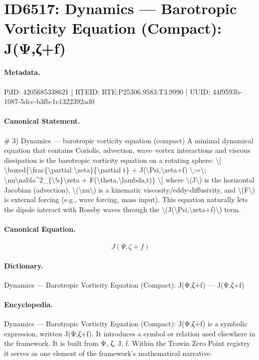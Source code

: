 \section*{ID6517: Dynamics — Barotropic Vorticity Equation (Compact): J(Ψ,ζ+f)}
\paragraph{Metadata.}
PiID: 4205685338621 | RTEID: RTE:P25306.9583:T3.9990 | UUID: 44f9593b-1087-5dcc-b3fb-1c1322392ad0

\paragraph{Canonical Statement.}
\# 3) Dynamics — barotropic vorticity equation (compact) A minimal dynamical equation that contains Coriolis, advection, wave–vortex interactions and viscous dissipation is the barotropic vorticity equation on a rotating sphere: \textbackslash{}[ \textbackslash{}boxed\{\textbackslash{}frac\{\textbackslash{}partial \textbackslash{}zeta\}\{\textbackslash{}partial t\} + J(\textbackslash{}Psi,\textbackslash{}zeta+f) \textbackslash{};=\textbackslash{}; \textbackslash{}nu\textbackslash{}nabla\textasciicircum{}2\_\{\textbackslash{}!s\}\textbackslash{}zeta + F(\textbackslash{}theta,\textbackslash{}lambda,t)\} \textbackslash{}] where \textbackslash{}(J\textbackslash{}) is the horizontal Jacobian (advection), \textbackslash{}(\textbackslash{}nu\textbackslash{}) is a kinematic viscosity/eddy-diffusivity, and \textbackslash{}(F\textbackslash{}) is external forcing (e.g., wave forcing, mass input). This equation naturally lets the dipole interact with Rossby waves through the \textbackslash{}(J(\textbackslash{}Psi,\textbackslash{}zeta+f)\textbackslash{}) term.

\paragraph{Canonical Equation.}
\[
J(\Psi,\zeta+f)
\]

\paragraph{Dictionary.}
Dynamics — Barotropic Vorticity Equation (Compact): J(Ψ,ζ+f) — J(Ψ,ζ+f)

\paragraph{Encyclopedia.}
Dynamics — Barotropic Vorticity Equation (Compact): J(Ψ,ζ+f) is a symbolic expression, written J(Ψ,ζ+f). It introduces a symbol or relation used elsewhere in the framework. It is built from Ψ, ζ, J, f. Within the Trawin Zero Point registry it serves as one element of the framework's mathematical narrative.
